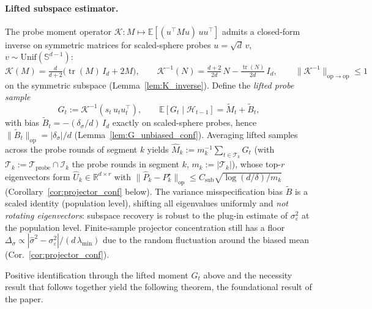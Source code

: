 \documentclass{article}
\newcommand{\R}{\mathbb{R}}
\newcommand{\E}{\mathbb{E}}
\newcommand{\op}{\mathrm{op}}
\newcommand{\cH}{\mathcal{H}}
\newcommand{\cT}{\mathcal{T}}
\newcommand{\cI}{\mathcal{I}}
\newcommand{\cTprobe}{\mathcal{T}_{\mathrm{probe}}}
\DeclareMathOperator{\tr}{tr}
\begin{document}
\paragraph{Lifted subspace estimator.}
The probe moment operator
$\mathcal K : M \mapsto \E[(u^\top M u)\,uu^\top]$ admits a
closed-form inverse on symmetric matrices for scaled-sphere probes
$u=\sqrt d\,v$, $v\sim\mathrm{Unif}(\mathbb S^{d-1})$:
\begin{equation}
\mathcal K(M) = \tfrac{d}{d+2}\bigl(\tr(M)\,I_d + 2M\bigr),\qquad
\mathcal K^{-1}(N) = \tfrac{d+2}{2d}\,N - \tfrac{\tr(N)}{2d}\,I_d,
\qquad \|\mathcal K^{-1}\|_{\op\to\op}\le 1
\label{eq:K_inverse_intro}
\end{equation}
on the symmetric subspace (Lemma~\ref{lem:K_inverse}). Define the
\emph{lifted probe sample}
\begin{equation}
G_t := \mathcal K^{-1}(s_t\,u_tu_t^\top),\qquad
\E[G_t\mid \cH_{t-1}] = \widetilde M_t + \widetilde B_t,
\label{eq:lifted_sample}
\end{equation}
with bias $\widetilde B_t = -(\delta_\sigma/d)\,I_d$ exactly on
scaled-sphere probes, hence $\|\widetilde B_t\|_\op = |\delta_\sigma|/d$
(Lemma~\ref{lem:G_unbiased_conf}). Averaging lifted samples across
the probe rounds of segment $k$ yields
$\widehat M_k := m_k^{-1}\sum_{t\in\cT_k} G_t$ (with $\cT_k:=\cTprobe\cap\cI_k$
the probe rounds in segment $k$, $m_k:=|\cT_k|$), whose top-$r$
eigenvectors form $\widehat U_k\in\R^{d\times r}$ with
$\|\widehat P_k - P_k^\star\|_\op \le C_{\mathrm{sub}}\sqrt{\log(d/\delta)/m_k}$
(Corollary~\ref{cor:projector_conf} below). The variance
misspecification bias $\widetilde B$ is a scaled identity (population
level), shifting all eigenvalues uniformly and \emph{not rotating
eigenvectors}: subspace recovery is robust to the plug-in estimate
of $\sigma_\varepsilon^2$ at the population level. Finite-sample
projector concentration still has a floor
$\Delta_\sigma\propto |\widehat\sigma^2-\sigma_\varepsilon^2|/(d\,\lambda_{\min})$
due to the random fluctuation around the biased mean
(Cor.~\ref{cor:projector_conf}).

Positive identification through the lifted moment $G_t$ above and
the necessity result that follows together yield the following
theorem, the foundational result of the paper.
\end{document}
